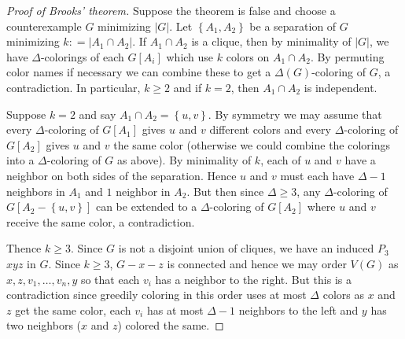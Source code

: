 \documentclass[12pt]{amsart}
\title{}
\theoremstyle{plain}
\theoremstyle{definition}
\theoremstyle{remark}
\newcommand{\set}[1]{\left\{ #1 \right\}}
\newcommand{\card}[1]{\left|#1\right|}
\newcommand{\DefinedAs}{\mathrel{\mathop:}=}
\begin{document}
\maketitle

\begin{proof}[Proof of Brooks' theorem]
Suppose the theorem is false and choose a counterexample $G$ minimizing $\card{G}$.  Let $\set{A_1, A_2}$ be a separation of $G$ minimizing $k \DefinedAs \card{A_1 \cap A_2}$.  If $A_1 \cap A_2$ is a clique, then by minimality of $\card{G}$, we have $\Delta$-colorings of each $G[A_i]$ which use $k$ colors on $A_1 \cap A_2$.  By permuting color names if necessary we can combine these to get a $\Delta(G)$-coloring of $G$, a contradiction.  In particular, $k \geq 2$ and if $k = 2$, then $A_1 \cap A_2$ is independent.

Suppose $k = 2$ and say $A_1 \cap A_2 = \set{u, v}$.  By symmetry we may assume that every $\Delta$-coloring of $G[A_1]$ gives $u$ and $v$ different colors and every $\Delta$-coloring of $G[A_2]$ gives $u$ and $v$ the same color (otherwise we could combine the colorings into a $\Delta$-coloring of $G$ as above).  By minimality of $k$, each of $u$ and $v$ have a neighbor on both sides of the separation.  Hence $u$ and $v$ must each have $\Delta-1$ neighbors in $A_1$ and $1$ neighbor in $A_2$.  But then since $\Delta \geq 3$, any $\Delta$-coloring of $G[A_2 - \set{u, v}]$ can be extended to a $\Delta$-coloring of $G[A_2]$ where $u$ and $v$ receive the same color, a contradiction.

Thence $k \geq 3$.  Since $G$ is not a disjoint union of cliques, we have an induced $P_3$ $xyz$ in $G$. Since $k \geq 3$, $G - x - z$ is connected and hence we may order $V(G)$ as $x, z, v_1, \ldots, v_n, y$ so that each $v_i$ has a neighbor to the right.  But this is a contradiction since greedily coloring in this order uses at most $\Delta$ colors as $x$ and $z$ get the same color, each $v_i$ has at most $\Delta - 1$ neighbors to the left and $y$ has two neighbors ($x$ and $z$) colored the same.
\end{proof}
\end{document}
